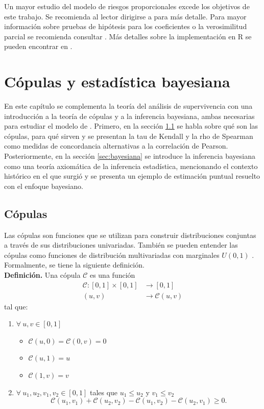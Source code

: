 \documentclass[11pt,a4paper]{article}
\newcommand{\C}{\mathcal{C}}
\begin{document}
Un mayor estudio del modelo de riesgos proporcionales excede los objetivos de este trabajo. Se recomienda al lector dirigirse a \citet{cox} para más detalle. Para mayor información sobre pruebas de hipótesis para los coeficientes o la verosimilitud parcial se recomienda consultar \citet{klein}. Más detalles sobre la implementación en R se pueden encontrar en \citet{moore}.
\newpage

\section{Cópulas y estadística bayesiana}

En este capítulo se complementa la teoría del análisis de supervivencia con una introducción a la teoría de cópulas y a la inferencia bayesiana, ambas necesarias para estudiar el modelo de \citet{nieto}. Primero, en la sección \ref{sec_copulas} se habla sobre qué son las cópulas, para qué sirven y se presentan la tau de Kendall y la rho de Spearman como medidas de concordancia alternativas a la correlación de Pearson. Posteriormente, en la sección \ref{sec:bayesiana} se introduce la inferencia bayesiana como una teoría axiomática de la inferencia estadística, mencionando el contexto histórico en el que surgió y se presenta un ejemplo de estimación puntual resuelto con el enfoque bayesiano.\\

\label{cap:cop}
\subsection{Cópulas} \label{sec_copulas}

Las cópulas son funciones que se utilizan para construir distribuciones conjuntas a través de sus distribuciones univariadas. También se pueden entender las cópulas como funciones de distribución multivariadas con marginales $U(0, 1)$ \citep{nelsen}. Formalmente, se tiene la siguiente definición.\\

\textbf{Definición.} Una cópula $\C$ es una función 
\begin{align*}
\C: [0,1]\times[0,1]&\to [0,1]\\
(u,v) &\to \C(u,v)
\end{align*} tal que:
\begin{enumerate}
\item $\forall \ u,v \in [0,1]$
\begin{itemize}
\item $\C (u,0) = \C (0,v) = 0$
\item $\C(u,1) = u$
\item $\C(1, v) = v$
\end{itemize}
\item $\forall \ u_1, u_2, v_1, v_2 \in [0,1]$ tales que $u_1 \leq u_2$ y $v_1 \leq v_2$  $$\C (u_1,v_1)+\C (u_2,v_2) - \C(u_1,v_2) - \C(u_2,v_1)\geq 0.$$\\
\end{enumerate}
\end{document}
